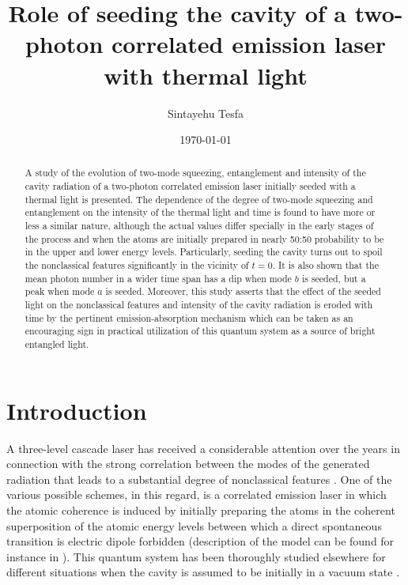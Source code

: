 \documentclass[twocolumn,showpacs,preprintnumbers,amsmath,amssymb,pra]{revtex4}
\begin{document}
\title{Role of seeding the cavity of a two-photon correlated emission laser with thermal light}


\author{Sintayehu Tesfa}

\date{\today}

\begin{abstract} A study of the evolution of two-mode squeezing, entanglement and intensity of the cavity radiation of a two-photon correlated emission laser initially seeded with a thermal light is presented. The dependence of the degree of two-mode squeezing and entanglement on the intensity of the thermal light and time is found to have more or less a similar nature, although the actual values differ specially in the early stages of the process and when the atoms are initially prepared in nearly 50:50 probability to be in the upper and lower energy levels. Particularly, seeding the cavity turns out to spoil the nonclassical features significantly in the vicinity of $t=0$.  It is also shown that the mean photon number in a wider time span has a dip when mode $b$ is seeded, but a peak when mode $a$ is seeded. Moreover, this study asserts that the effect of the seeded light on the nonclassical features and intensity of the cavity radiation is eroded with time by the pertinent emission-absorption mechanism which can be taken as an encouraging sign in practical utilization of this quantum system as a source of bright entangled light.\end{abstract}

\maketitle


 \section{Introduction}


A three-level cascade laser  has received a considerable attention over the years in connection with the strong correlation between the modes of the generated radiation that leads to a substantial degree of nonclassical features \cite{pra74043816,pra77013815,pra79013831,oc283781,prl601832,pra415179,pra484686,prl94023601,pra79063815,pra77062308,jpb41215502}. One of the various possible schemes, in this regard,  is a correlated emission laser  in which the atomic coherence is induced by initially preparing the atoms in the coherent superposition of the atomic energy levels between which a direct spontaneous transition is electric dipole forbidden (description of the model can be found for instance in \cite{pra74043816, pra77013815,jpb402373}). This quantum system has been thoroughly studied elsewhere for different situations  when the cavity is assumed to be initially in a vacuum state \cite{pra74043816,pra77013815,jpb402373,jpb42215506}. 
\end{document}
